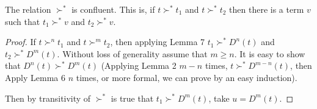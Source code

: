 \begin{theorem}
  The relation $\succ^{*}$ is confluent. This is, if $t \succ^{*} t_1$
  and $t \succ^{*} t_2$ then there is a term $v$ such that $t_1 \succ^{*} v$
  and $t_2 \succ^{*} v$.
\end{theorem}

\begin{proof}
  If $t \succ^{n} t_1$ and $t \succ^{m} t_2$, then applying Lemma 7
  $t_1 \succ^{*} D^n(t)$ and $t_2 \succ^{*} D^m(t)$.
  Without loss of generality assume that $m \geq n$. It is easy to show that
  $D^n(t) \succ^{*} D^m(t)$ (Applying Lemma 2 $m-n$ times,
  $t \succ^{*} D^{m-n}(t)$, then Apply Lemma 6 $n$ times, or more formal, we
  can prove by an easy induction).

  Then by transitivity of $\succ^{*}$ is true that $t_1 \succ^{*} D^m(t)$,
  take $u = D^m(t)$.
\end{proof}
